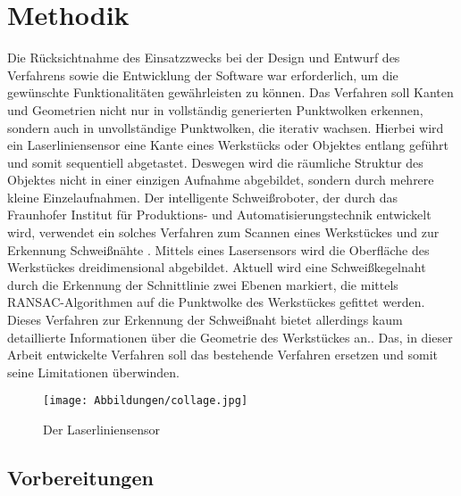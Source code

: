 

\chapter{Methodik}
Die Rücksichtnahme des Einsatzzwecks bei der Design und Entwurf des Verfahrens sowie die Entwicklung der Software war erforderlich, um die gewünschte Funktionalitäten gewährleisten zu können. Das Verfahren soll Kanten und Geometrien nicht nur in vollständig generierten Punktwolken erkennen, sondern auch in unvollständige Punktwolken, die iterativ wachsen. Hierbei wird ein Laserliniensensor eine Kante eines Werkstücks oder Objektes entlang geführt und somit sequentiell abgetastet. Deswegen wird die räumliche Struktur des Objektes nicht in einer einzigen Aufnahme abgebildet, sondern durch mehrere kleine Einzelaufnahmen. Der intelligente Schweißroboter, der durch das Fraunhofer Institut für Produktions- und Automatisierungstechnik entwickelt wird, verwendet ein solches Verfahren zum Scannen eines Werkstückes und zur Erkennung Schweißnähte \autocite[39]{savla_intelligente_2022}. Mittels eines Lasersensors wird die Oberfläche des Werkstückes dreidimensional abgebildet. Aktuell wird eine Schweißkegelnaht durch die Erkennung der Schnittlinie zwei Ebenen markiert, die mittels RANSAC-Algorithmen auf die Punktwolke des Werkstückes gefittet werden. Dieses Verfahren zur Erkennung der Schweißnaht bietet allerdings kaum detaillierte Informationen über die Geometrie des Werkstückes an.\autocite[39-52]{savla_intelligente_2022}. Das, in dieser Arbeit entwickelte Verfahren soll das bestehende Verfahren ersetzen und somit seine Limitationen überwinden. %

\begin{figure}[h]
	\texttt{[image: Abbildungen/collage.jpg]}
	\centering
	\caption{Der Laserliniensensor} 
\end{figure}

\section{Vorbereitungen} \label{agpn_reproduction}
